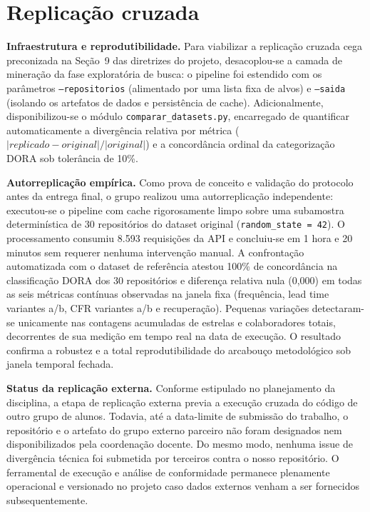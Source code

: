 \documentclass[12pt]{article}
\begin{document}
\section{Replicação cruzada}\label{sec:replicacao}

\textbf{Infraestrutura e reprodutibilidade.} Para viabilizar a replicação cruzada cega preconizada na Seção~9 das diretrizes do projeto, desacoplou-se a camada de mineração da fase exploratória de busca: o pipeline foi estendido com os parâmetros \texttt{--repositorios} (alimentado por uma lista fixa de alvos) e \texttt{--saida} (isolando os artefatos de dados e persistência de cache). Adicionalmente, disponibilizou-se o módulo \texttt{comparar\_datasets.py}, encarregado de quantificar automaticamente a divergência relativa por métrica ($|replicado - original| / |original|$) e a concordância ordinal da categorização DORA sob tolerância de 10\%.

\textbf{Autorreplicação empírica.} Como prova de conceito e validação do protocolo antes da entrega final, o grupo realizou uma autorreplicação independente: executou-se o pipeline com cache rigorosamente limpo sobre uma subamostra determinística de 30 repositórios do dataset original (\texttt{random\_state = 42}). O processamento consumiu 8.593 requisições da API e concluiu-se em 1 hora e 20 minutos sem requerer nenhuma intervenção manual. A confrontação automatizada com o dataset de referência atestou 100\% de concordância na classificação DORA dos 30 repositórios e diferença relativa nula (0,000) em todas as seis métricas contínuas observadas na janela fixa (frequência, lead time variantes a/b, CFR variantes a/b e recuperação). Pequenas variações detectaram-se unicamente nas contagens acumuladas de estrelas e colaboradores totais, decorrentes de sua medição em tempo real na data de execução. O resultado confirma a robustez e a total reprodutibilidade do arcabouço metodológico sob janela temporal fechada.

\textbf{Status da replicação externa.} Conforme estipulado no planejamento da disciplina, a etapa de replicação externa previa a execução cruzada do código de outro grupo de alunos. Todavia, até a data-limite de submissão do trabalho, o repositório e o artefato do grupo externo parceiro não foram designados nem disponibilizados pela coordenação docente. Do mesmo modo, nenhuma issue de divergência técnica foi submetida por terceiros contra o nosso repositório. O ferramental de execução e análise de conformidade permanece plenamente operacional e versionado no projeto caso dados externos venham a ser fornecidos subsequentemente.
\end{document}
